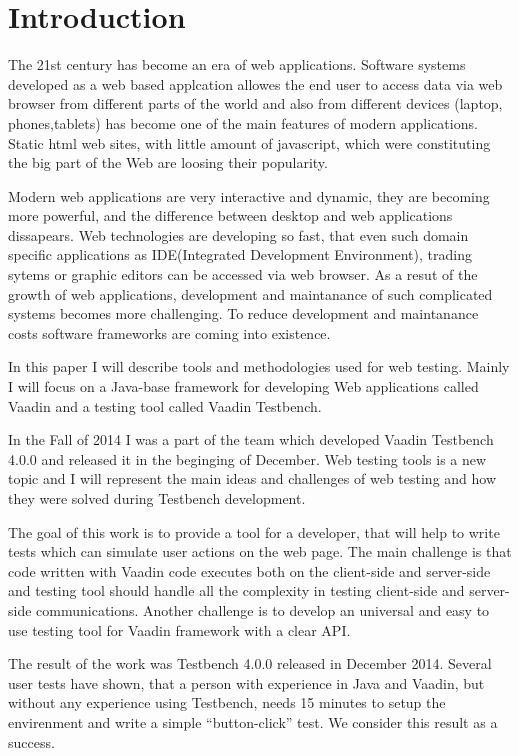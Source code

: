 	
	 \chapter{Introduction}
	 \label{ch:intro} 		
	The 21st century has become an era of web applications. Software systems
	developed as a web based applcation allowes the end user to access data via web browser
	from different parts of the world and also from different devices (laptop,
	phones,tablets) has become one of the main features of modern
	applications. Static html web sites, with little amount of javascript, which
	were constituting the big part of the Web are loosing their popularity.
	
	 Modern web	applications are very interactive and dynamic, they are becoming
	more powerful, and the difference between desktop and web applications
	dissapears. Web technologies are developing so fast, that even such domain
	specific applications as IDE(Integrated Development Environment), trading
	sytems or graphic editors can be accessed via web browser. As a resut of the
	growth of web applications, development and maintanance of such complicated
	systems becomes more challenging. To reduce development and maintanance costs
	software frameworks are coming into existence.
	
	In this paper I will describe tools and methodologies used for web testing. Mainly I will focus on a Java-base
	framework for developing Web applications called Vaadin and a testing tool
	called Vaadin Testbench.
	
	 In the Fall of 2014 I was a part of the team which developed Vaadin Testbench
	 4.0.0 and released it in the beginging of December. Web testing tools is a
	 new topic and I will represent the main ideas and challenges
	 of web testing and how they were solved during Testbench development.
	 
	 The goal of this work is to provide a tool for a developer, that will help to
	 write tests which can simulate user actions on the web page. The main
	 challenge is that code written with Vaadin code executes both on the
	 client-side and server-side and testing tool should handle all the complexity
	 in testing client-side and server-side communications. Another challenge is to
	 develop an universal and easy to use testing tool for Vaadin framework with a
	 clear API.
	 
	  The result of the work was Testbench 4.0.0 released in December 2014.
	  Several user tests have shown, that a person with experience in Java and
	  Vaadin, but without any experience using Testbench, needs 15 minutes to setup
	  the envirenment and write a simple ``button-click'' test. We consider this
	  result as a success.
	  
